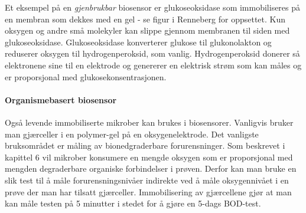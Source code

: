 Et eksempel på en \emph{gjenbrukbar} biosensor er glukoseoksidase som immobiliseres på en membran som dekkes med en gel - se figur i Renneberg for oppsettet. Kun oksygen og andre små molekyler kan slippe gjennom membranen til siden med glukoseoksidase. Glukoseoksidase konverterer glukose til glukonolakton og reduserer oksygen til hydrogenperoksid, som vanlig. Hydrogenperoksid donerer så elektronene sine til en elektrode og genererer en elektrisk strøm som kan måles og er proporsjonal med glukosekonsentrasjonen.

\paragraph{Organismebasert biosensor} Også levende immobiliserte mikrober kan brukes i biosensorer. Vanligvis bruker man gjærceller i en polymer-gel på en oksygenelektrode. Det vanligste bruksområdet er måling av bionedgraderbare forurensninger. Som beskrevet i kapittel 6 vil mikrober konsumere en mengde oksygen som er proporsjonal med mengden degraderbare organiske forbindelser i prøven. Derfor kan man bruke en slik test til å måle forurensningsnivåer indirekte ved å måle oksygennivået i en prøve der man har tilsatt gjærceller. Immobilisering  av gjærcellene gjør at man kan måle testen på 5 minutter i stedet for å gjøre en 5-dags BOD-test.

